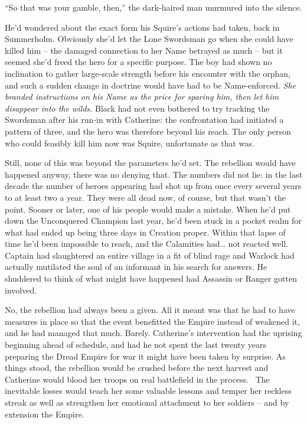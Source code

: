 \documentclass[12pt, openany]{book}
\begin{document}
“So that was your gamble, then,” the dark-haired man murmured into the silence.

He’d wondered about the exact form his Squire’s actions had taken, back in Summerholm. Obviously she’d let the Lone Swordsman go when she could have killed him – the damaged connection to her Name betrayed as much – but it seemed she’d freed the hero for a specific purpose. The boy had shown no inclination to gather large-scale strength before his encounter with the orphan, and such a sudden change in doctrine would have had to be Name-enforced. \textit{She branded instructions on his Name as the price for sparing him, then} \textit{let him disappear into the wilds.} Black had not even bothered to try tracking the Swordsman after his run-in with Catherine: the confrontation had initiated a pattern of three, and the hero was therefore beyond his reach. The only person who could feasibly kill him now was Squire, unfortunate as that was.

Still, none of this was beyond the parameters he’d set. The rebellion would have happened anyway, there was no denying that. The numbers did not lie: in the last decade the number of heroes appearing had shot up from once every several years to at least two a year. They were all dead now, of course, but that wasn’t the point. Sooner or later, one of his people would make a mistake. When he’d put down the Unconquered Champion last year, he’d been stuck in a pocket realm for what had ended up being three days in Creation proper. Within that lapse of time he’d been impossible to reach, and the Calamities had… not reacted well. Captain had slaughtered an entire village in a fit of blind rage and Warlock had actually mutilated the soul of an informant in his search for answers. He shuddered to think of what might have happened had Assassin or Ranger gotten involved.

No, the rebellion had always been a given. All it meant was that he had to have measures in place so that the event benefitted the Empire instead of weakened it, and he had managed that much. Barely. Catherine’s intervention had the uprising beginning ahead of schedule, and had he not spent the last twenty years preparing the Dread Empire for war it might have been taken by surprise. As things stood, the rebellion would be crushed before the next harvest and Catherine would blood her troops on real battlefield in the process.  The inevitable losses would teach her some valuable lessons and temper her reckless streak as well as strengthen her emotional attachment to her soldiers – and by extension the Empire.
\end{document}
